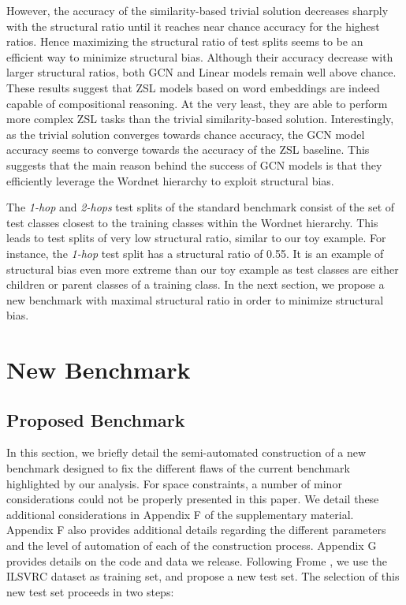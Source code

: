 However, the accuracy of the similarity-based trivial solution decreases sharply with the structural ratio until it reaches near chance accuracy for the highest ratios.
Hence maximizing the structural ratio of test splits seems to be an efficient way to minimize structural bias.
Although their accuracy decrease with larger structural ratios, both GCN and Linear models remain well above chance.
These results suggest that ZSL models based on word embeddings are indeed capable of compositional reasoning.
At the very least, they are able to perform more complex ZSL tasks than the trivial similarity-based solution.
Interestingly, as the trivial solution converges towards chance accuracy, 
the GCN model accuracy seems to converge towards the accuracy of the ZSL baseline.
This suggests that the main reason behind the success of GCN models is that they 
efficiently leverage the Wordnet hierarchy to exploit structural bias.

The \textit{1-hop} and \textit{2-hops} test splits of the standard benchmark consist of the set of test classes closest to the training classes within the Wordnet hierarchy.
This leads to test splits of very low structural ratio, similar to our toy example.
For instance, the \textit{1-hop} test split has a structural ratio of 0.55.
It is an example of structural bias even more extreme than 
our toy example as test classes are either children or parent classes of a training class.
In the next section, we propose a new benchmark with maximal structural ratio in order to minimize structural bias.

\section{New Benchmark}

\subsection{Proposed Benchmark}

In this section, we briefly detail the semi-automated construction of a new benchmark 
designed to fix the different flaws of the current benchmark highlighted by our analysis.
For space constraints, a number of minor considerations could not be properly presented in this paper.
We detail these additional considerations in Appendix F of the supplementary material. 
Appendix F also provides additional details regarding the different parameters
and the level of automation of each of the construction process.
Appendix G provides details on the code and data we release.
Following Frome \etal \cite{frome2013devise}, we use the ILSVRC dataset as training set, and propose a new test set.
The selection of this new test set proceeds in two steps:

